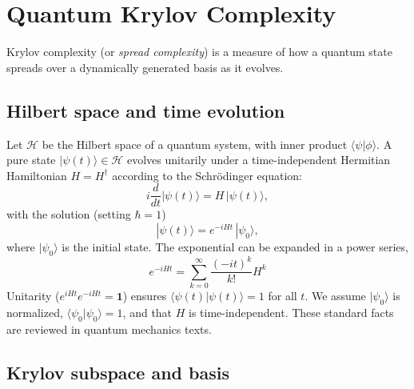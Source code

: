 \documentclass[11pt]{article}
\begin{document}


\section{Quantum Krylov Complexity}




Krylov complexity (or \emph{spread complexity}) is a measure of how a quantum state spreads over a dynamically generated basis as it evolves.

\subsection{Hilbert space and time evolution}

Let $\mathcal{H}$ be the Hilbert space of a quantum system, with inner product $\langle\psi|\phi\rangle$.  A pure state $|\psi(t)\rangle\in\mathcal{H}$ evolves unitarily under a time-independent Hermitian Hamiltonian $H=H^\dagger$ according to the Schrödinger equation:
\begin{equation}
i\frac{d}{dt}|\psi(t)\rangle 
= H\,|\psi(t)\rangle,
\end{equation}
with the solution (setting $\hbar=1$)
\begin{equation*}
|\psi(t)\rangle = e^{-iHt}\,|\psi_0\rangle,
\end{equation*}
where $|\psi_0\rangle$ is the initial state.  The exponential can be expanded in a power series,
\begin{equation*}
e^{-iHt} = \sum_{k=0}^\infty \frac{(-it)^k}{k!}H^k
\end{equation*}
Unitarity ($e^{iHt}e^{-iHt}=\mathbf{1}$) ensures $\langle\psi(t)|\psi(t)\rangle=1$ for all $t$.  We assume $|\psi_0\rangle$ is normalized, $\langle\psi_0|\psi_0\rangle=1$, and that $H$ is time-independent.  These standard facts are reviewed in quantum mechanics texts.

\subsection{Krylov subspace and basis}
\end{document}
